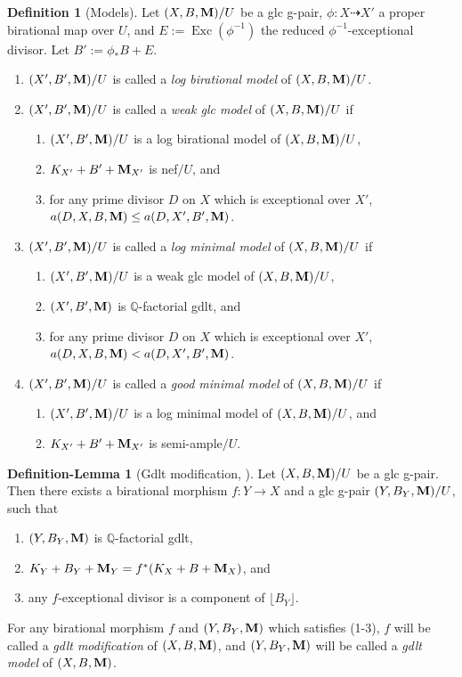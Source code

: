 \documentclass[11pt]{amsart}
\numberwithin{equation}{section}
\newcommand{\Mm}{{\bf{M}}}
\newcommand{\Qq}{\mathbb{Q}}
\newcommand{\Exc}{\operatorname{Exc}}
\theoremstyle{definition}
\newtheorem{defn}[thm]{Definition}
\theoremstyle{definition}
\newtheorem{deflem}[thm]{Definition-Lemma}
\theoremstyle{definition}
\begin{document}
\begin{defn}[Models]\label{defn: models}
Let $(X,B,\Mm)/U$ be a glc g-pair, $\phi: X\dashrightarrow X'$ a proper birational map over $U$, and $E:=\Exc(\phi^{-1})$ the reduced $\phi^{-1}$-exceptional divisor. Let $B':=\phi_*B+E$.

\begin{enumerate}
    \item $(X',B',\Mm)/U$ is called a \emph{log birational model} of $(X,B,\Mm)/U$. 
    \item $(X',B',\Mm)/U$ is called a \emph{weak glc model} of $(X,B,\Mm)/U$ if
\begin{enumerate}
\item $(X',B',\Mm)/U$ is a log birational model of $(X,B,\Mm)/U$, 
    \item $K_{X'}+B'+\Mm_{X'}$ is nef$/U$, and
    \item for any prime divisor $D$ on $X$ which is exceptional over $X'$, $a(D,X,B,\Mm)\leq a(D,X',B',\Mm)$.
\end{enumerate}
\item $(X',B',\Mm)/U$ is called a \emph{log minimal model} of $(X,B,\Mm)/U$ if
\begin{enumerate}
    \item $(X',B',\Mm)/U$ is a weak glc model of $(X,B,\Mm)/U$,
    \item $(X',B',\Mm)$ is $\Qq$-factorial gdlt, and
    \item for any prime divisor $D$ on $X$ which is exceptional over $X'$, $a(D,X,B,\Mm)<a(D,X',B',\Mm)$.
\end{enumerate}
\item 
$(X',B',\Mm)/U$ is called a \emph{good minimal model} of $(X,B,\Mm)/U$ if
\begin{enumerate}
        \item $(X',B',\Mm)/U$ is a log minimal model of $(X,B,\Mm)/U$, and
        \item $K_{X'}+B'+\Mm_{X'}$ is semi-ample$/U$.
\end{enumerate}
\end{enumerate}
\end{defn}

\begin{deflem}[Gdlt modification, {\cite[Proposition 3.9]{HL18}}]\label{deflem: gdlt modification}
Let $(X,B,\Mm)/U$ be a glc g-pair. Then there exists a birational morphism $f: Y\rightarrow X$ and a glc g-pair $(Y,B_Y,\Mm)/U$, such that
\begin{enumerate}
\item $(Y,B_Y,\Mm)$ is $\Qq$-factorial gdlt,
    \item $K_Y+B_Y+\Mm_Y=f^*(K_X+B+\Mm_X)$, and
    \item any $f$-exceptional divisor is a component of $\lfloor B_Y\rfloor$.
\end{enumerate}
For any birational morphism $f$ and $(Y,B_Y,\Mm)$ which satisfies (1-3), $f$ will be called a \emph{gdlt modification} of $(X,B,\Mm)$, and $(Y,B_Y,\Mm)$ will be called a  \emph{gdlt model} of $(X,B,\Mm)$.
\end{deflem}
\end{document}
